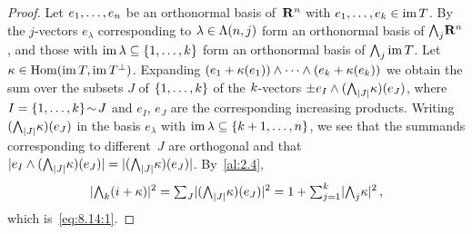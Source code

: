 \begin{proof}
    Let $e_1, \ldots, e_{n}$ be an orthonormal basis of~$\mathbf{R}^{n}$ with $e_1, \ldots,
    e_{k} \in \operatorname{im} T$. By~\cite[1.7.5]{Federer1969} the $j$-vectors $e_\lambda$ corresponding to
    $\lambda \in \Lambda(n,j)$ form an orthonormal basis of ${\textstyle\boldsymbol{\bigwedge}}_{{j}} \mathbf{R}^{n}$, and those
    with $\operatorname{im} \lambda \subseteq \{1, \ldots, k\}$ form an orthonormal basis of ${\textstyle\boldsymbol{\bigwedge}}_{{j}}
    \operatorname{im} T$. Let $\kappa \in \operatorname{Hom}(\operatorname{im} T, \operatorname{im} T^\perp)$. Expanding $(e_1 + \kappa(e_1)) \wedge \cdots
    \wedge (e_{k} + \kappa(e_{k}))$ we obtain the sum over the subsets $J$ of $\{1, \ldots,
    k\}$ of the $k$-vectors $\pm e_{I} \wedge ({\textstyle\boldsymbol{\bigwedge}}_{{|J|}} \kappa)(e_J)$, where $I = \{1,
    \ldots, k\} \!\sim\! J$ and $e_I$, $e_J$ are the corresponding increasing products. Writing
    $({\textstyle\boldsymbol{\bigwedge}}_{{|J|}} \kappa)(e_J)$ in the basis $e_\lambda$ with $\operatorname{im} \lambda \subseteq \{k+1,
    \ldots, n\}$, we see that the summands corresponding to different~$J$ are orthogonal and
    that $|e_I \wedge ({\textstyle\boldsymbol{\bigwedge}}_{{|J|}}\kappa)(e_J)| = |({\textstyle\boldsymbol{\bigwedge}}_{{|J|}} \kappa)(e_J)|$. By~\ref{al:2.4},
    \begin{displaymath}
        |{\textstyle\boldsymbol{\bigwedge}}_{{k}} (i + \kappa)|^2 = {\textstyle\sum_{J}^{}} |({\textstyle\boldsymbol{\bigwedge}}_{{|J|}} \kappa)(e_J)|^2 = 1 +
        {\textstyle\sum_{j=1}^{k}} |{\textstyle\boldsymbol{\bigwedge}}_{{j}} \kappa|^2 \,,
    \end{displaymath}
    which is~\eqref{eq:8.14:1}.


\end{proof}
